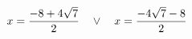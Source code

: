 \documentclass[preview]{standalone}
\begin{document}
\begin{align*}
\special{dvisvgm:raw <g id='unique000'>}x=\frac{-8 + 4 \sqrt{7}}{2} \quad \lor \quad x=\frac{- 4 \sqrt{7} - 8}{2}\special{dvisvgm:raw </g>}
\end{align*}
\end{document}
